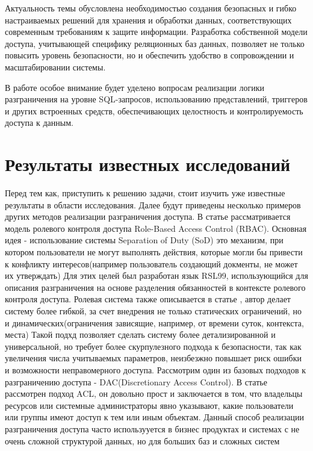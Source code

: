 \documentclass[14pt, a4paper]{extarticle}
\begin{document}
Актуальность темы обусловлена необходимостью создания безопасных и гибко настраиваемых решений для хранения и обработки данных, соответствующих современным требованиям к защите информации. Разработка собственной модели доступа, учитывающей специфику реляционных баз данных, позволяет не только повысить уровень безопасности, но и обеспечить удобство в сопровождении и масштабировании системы.

В работе особое внимание будет уделено вопросам реализации логики разграничения на уровне SQL-запросов, использованию представлений, триггеров и других встроенных средств, обеспечивающих целостность и контролируемость доступа к данным.


\section{Результаты известных исследований}
Перед тем как, приступить к решению задачи, стоит изучить уже известные результаты в области исследования. Далее будут приведены несколько примеров других методов реализации разграничения доступа.
В статье \cite{Ahn1999} рассматривается модель ролевого контроля доступа Role-Based Access Control (RBAC). Основная идея - использование системы
Separation of Duty (SoD) это механизм, при котором пользователи не могут выполнять действия, которые могли бы привести к конфликту интересов(например пользователь создающий докменты, не может их утверждать)
Для этих целей был разработан язык RSL99, использующийся для описания разграничения на основе разделения обязанностей в контексте ролевого контроля доступа.
Ролевая система также описывается в статье \cite{Crampton2003}, автор делает систему более гибкой, за счет внедрения не только статических ограничений, но и динамических(ограничения зависящие, например, от времени суток, контекста, места)
Такой подхд позволяет сделать систему более детализированной и универсальной, но требует более скурпулезного подхода к безопасности, так как увеличения числа учитываемых параметров, неизбезжно повышает риск ошибки и возможности неправомерного доступа.
Рассмотрим один из базовых подходов к разграничению доступа - DAC(Discretionary Access Control). В статье \cite{Coyne1991} рассмотрен подход ACL, он довольно прост и заключается в том, что владельцы ресурсов или системные администраторы 
явно указывают, какие пользователи или группы имеют доступ к тем или иным объектам. Данный способ реализации разграничения доступа часто использууется в бизнес продуктах и системах с не очень сложной структурой данных, но для больших баз и сложных систем
\end{document}
